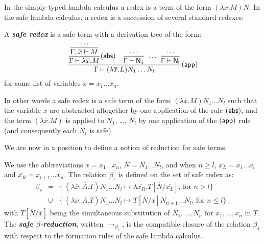 \documentclass{llncs}
\newcommand\defname[1]{{\bf\em #1}\index{#1}}
\newcommand\betasred{\rightarrow_{\beta_s}}
\newcommand\subst[2]{\left[ #1/#2 \right]}
\newcommand\rulef[2]{\frac{\dps #1}{\dps #2}}
\begin{document}
In the simply-typed lambda calculus a redex is a term of the form
$(\lambda x . M) N$. In the safe lambda calculus, a redex is a
succession of several standard redexes:
\begin{definition}\rm
A \defname{safe redex} is a safe term with a derivation tree of the form:
$$   \rulef{
            \rulef{\rulef{\ldots}{\Gamma, \overline{x}\vdash M}}{\Gamma \vdash \lambda \overline{x} . M} (\sf{abs})
            \quad
            \rulef{\ldots}{\Gamma \vdash N_1}  \ \ldots \  \rulef{\ldots}{\Gamma \vdash N_l}
    }
    {
       \Gamma \vdash (\lambda \overline{x} . L) N_1 \ldots N_l
    } (\sf{app})
$$
for some list of variables $\overline{x}=x_1\ldots x_n$.
\end{definition}

In other words a safe redex is a safe term of the form $(\lambda
\overline{x} . M) N_1 \ldots N_l$ such that the variable
$\overline{x}$ are abstracted altogether by one application of the
rule $(\sf{abs})$, and the term $(\lambda \overline{x} . M)$ is
applied to $N_1$, \ldots, $N_l$ by one application of the $(\sf{app})$
rule (and consequently each $N_i$ is safe).



We are now in a position to define a notion of reduction for safe terms.

\begin{definition}\rm
\label{dfn:safereduction} We use the
abbreviations $\overline{x} = x_1 \ldots x_n$,
$\overline{N} = N_1 \ldots N_l$, and when $n\geq l$, $\overline{x_L}
= x_1 \ldots x_l$ and $\overline{x_R} = x_{l+1} \ldots x_n$.
The relation $\beta_s$ is defined on the set of safe redex as:
\begin{eqnarray*}
  \beta_s &=&
  \{  \ (\lambda \overline{x} : \overline{A} . T) N_1 \ldots N_l \mapsto \lambda \overline{x_R}. T\subst{\overline{N}}{\overline{x_L}} \mbox{, for $n> l$}
  \} \\
  &\cup&
  \{ \ (\lambda \overline{x} : \overline{A} . T) N_1 \ldots N_l \mapsto T\subst{\overline{N}}{\overline{x}} N_{n+1} \ldots N_l
  \mbox{, for $n\leq l$} \} \ .
\end{eqnarray*}
with $T\subst{\overline{N}}{\overline{x}}$ being the simultaneous
substitution of $N_1,\ldots,N_n$ for $x_1, \ldots, x_n$ in $T$.  The
\defname{safe $\beta$-reduction}, written $\betasred$, is the
compatible closure of the relation $\beta_s$ with respect to the
formation rules of the safe lambda calculus.
\end{definition}
\end{document}
